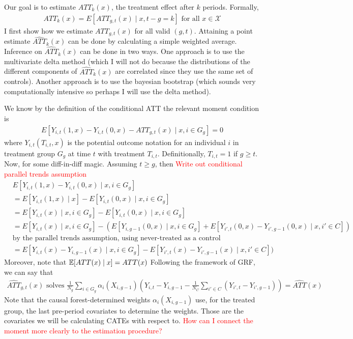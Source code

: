 \documentclass[source/paper/main.tex]{subfiles}
\begin{document}
Our goal is to estimate $ATT_{k}(x)$, the treatment effect after $k$ periods. Formally, 
\begin{align}
    ATT_{k}(x) = E[ATT_{g,t}(x) \mid x, t-g = k] \text{ for all } x \in \mathcal{X}
\end{align}
I first show how we estimate $ATT_{g,t}(x)$ for all valid $(g, t)$. Attaining a point estimate $\widehat{ATT}_{k}(x)$ can be done by calculating a simple weighted average. Inference on $\widehat{ATT}_{k}(x)$ can be done in two ways. One approach is to use the multivariate delta method (which I will not do because the distributions of the different components of $\widehat{ATT}_{k}(x)$ are correlated since they use the same set of controls). Another approach is to use the bayesian bootstrap (which sounds very computationally intensive so perhaps I will use the delta method).

We know by the definition of the conditional ATT the relevant moment condition is
\begin{align}
    E[Y_{i,t}(1, x) - Y_{i,t}(0, x) - ATT_{g,t}(x) \mid x, i \in G_g] = 0
\end{align}
where $Y_{i,t}(T_{i,t}, x)$ is the potential outcome notation for an individual $i$ in treatment group $G_g$ at time $t$ with treatment $T_{i,t}$. Definitionally, $T_{i,t} = 1$ if $g \geq t$. Now, for some diff-in-diff magic. Assuming $t\geq g$, then \textcolor{red}{Write out conditional parallel trends assumption}
\begin{align*}
    &E[Y_{i,t}(1, x) - Y_{i,t}(0, x)  \mid x, i \in G_g]\\
    &= E[Y_{i,t}(1, x) \mid x] - E[Y_{i,t}(0, x) \mid x, i \in G_g]  \\
    &= E[Y_{i,t}(x) \mid x, i \in G_g] - E[Y_{i,t}(0, x) \mid x, i \in G_g] \\
    &= E[Y_{i,t}(x) \mid x, i \in G_g] - (E[Y_{i,g-1}(0, x) \mid x, i \in G_g] + E[Y_{i',t}(0, x) - Y_{i',g-1}(0, x) \mid x, i' \in C] )\\
    &\text{by the parallel trends assumption, using never-treated as a control}\\
    &= E[Y_{i,t}(x) - Y_{i,g-1}(x) \mid x, i \in G_g] - E[Y_{i',t}(x) - Y_{i',g-1}(x) \mid x, i' \in C] )
\end{align*}
Moreover, note that $\mathbb{E}[ATT(x) \mid x] = ATT(x)$
Following the framework of GRF, we can say that
\begin{align*}
    \widehat{ATT}_{g,t}(x) \text{ solves } \frac{1}{N_g}  \sum_{i \in G_g} \alpha_i(X_{i, g-1}) \left(Y_{i,t} - Y_{i,g-1} -  \frac{1}{N_C} \sum_{i' \in C} (Y_{i',t} - Y_{i',g-1})\right) = \widehat{ATT}(x)
\end{align*}
Note that the causal forest-determined weights $\alpha_i(X_{i, g-1})$ use, for the treated group, the last pre-period covariates to determine the weights. Those are the covariates we will be calculating CATEs with respect to. \textcolor{red}{How can I connect the moment more clearly to the estimation procedure?}
\end{document}

